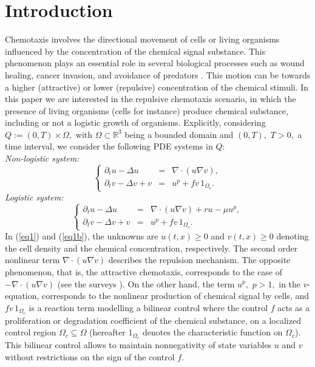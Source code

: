 \documentclass[11pt,reqno]{amsart}%
\numberwithin{equation}{section}
\begin{document}
\section{Introduction}
Chemotaxis involves the  directional movement of cells or living organisms influenced by the concentration of the chemical signal substance. This phenomenon plays an essential role in several biological processes such as wound healing, cancer invasion, and avoidance of predators \cite{Isenbach}. 
This motion can be towards a higher (attractive) or lower (repulsive) concentration of the chemical stimuli. In this paper we are interested in the repulsive chemotaxis scenario, in which the presence
of living organisms (cells for instance) produce chemical substance, including or not a logistic growth of organisms. Explicitly, considering $Q:=(0,T)\times\Omega,$ with $\Omega\subset\mathbb{R}^3$ being a bounded domain and $(0,T),$ $T>0,$ a time interval, we consider the following PDE systems in $Q$:\\
{\it Non-logistic system:}
\begin{equation}\label{eq1}
\left\{
\begin{array}{rcl}
\partial_tu-\Delta u&=&\nabla\cdot(u\nabla v),\\
\partial_tv-\Delta v+v&=&u^p+fv\, 1_{\Omega_c}.
\end{array}
\right.
\end{equation}
{\it Logistic system:}
 \begin{equation}\label{eq1b}
\left\{
\begin{array}{rcl}
\partial_tu-\Delta u&=&\nabla\cdot(u\nabla v)+ru-\mu u^p,\\
\partial_tv-\Delta v+v&=&u^p+fv\, 1_{\Omega_c}.
\end{array}
\right.
\end{equation}
In (\ref{eq1}) and (\ref{eq1b}), the unknowns are $u(t,x)\ge0$ and  $v(t,x)\ge 0$ denoting the cell density
 and the chemical concentration,
 respectively.  The second order nonlinear term $\nabla\cdot(u\nabla v)$ 
 describes the repulsion mechanism. The opposite phenomenon, that is, the attractive chemotaxis, corresponds to the case of $-\nabla\cdot(u\nabla v)$ (see the surveys \cite{Bellomo,Hillen,Lankeit}). 
On the other hand, the term $u^p,$ $p>1,$ in the $v$-equation, corresponds to the nonlinear production of chemical signal by cells, and $fv\, 1_{\Omega_c}$ is a reaction term modelling a bilinear control where the control $f$ acts as a proliferation or degradation coefficient of the chemical substance, on a localized control region $\Omega_c\subseteq \Omega$ (hereafter $1_{\Omega_c}$ denotes the characteristic function on $\Omega_c$). This bilinear control allows to maintain nonnegativity of state variables $u$ and $v$ without restrictions on the sign of the control $f$.  
\end{document}
